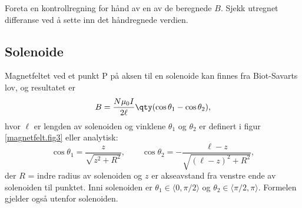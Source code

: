\documentclass[../Elmag-labhefte-2020.tex]{subfiles}
\begin{document}
Foreta en kontrollregning for hånd av en av de beregnede $B$. Sjekk utregnet differanse ved å sette inn det håndregnede verdien.

\subsection{Solenoide \label{ch.magnetfelt.solenoide}}

Magnetfeltet ved et punkt P på aksen til en solenoide kan finnes fra Biot-Savarts lov, og resultatet er
\begin{equation}
    B = \frac{N \mu_0 I} {2 \ell} \qty(\cos\theta_1 - \cos\theta_2),
    \label{eq:solenoide}
\end{equation}
hvor $\ell$ er lengden av solenoiden og vinklene $\theta_1$ og $\theta_2$ er definert i figur \ref{magnetfelt.fig3} eller analytisk:
\begin{equation}
    \cos \theta_1 = \frac{z}{\sqrt{z^2 + R^2}}, \qquad
    \cos \theta_2 = - \frac{\ell - z}{\sqrt{(\ell - z)^2 + R^2}},
\end{equation}
der $R$ = indre radius av solenoiden og $z$ er akseavstand fra venstre ende av solenoiden til punktet. Inni solenoiden er $\theta_1 \in \langle 0, \pi/2 \rangle$ og $\theta_2 \in \langle \pi/2, \pi \rangle$. Formelen gjelder også utenfor solenoiden.
%
\end{document}

